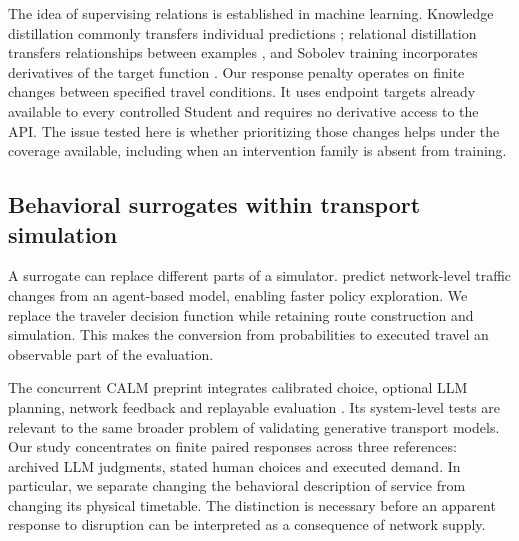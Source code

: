 The idea of supervising relations is established in machine learning. Knowledge distillation commonly transfers individual predictions \citep{hinton2015distilling,gou2021knowledge}; relational distillation transfers relationships between examples \citep{park2019relational}, and Sobolev training incorporates derivatives of the target function \citep{czarnecki2017sobolev}. Our response penalty operates on finite changes between specified travel conditions. It uses endpoint targets already available to every controlled Student and requires no derivative access to the API. The issue tested here is whether prioritizing those changes helps under the coverage available, including when an intervention family is absent from training.

\subsection{Behavioral surrogates within transport simulation}
A surrogate can replace different parts of a simulator. \citet{natterer2025surrogates} predict network-level traffic changes from an agent-based model, enabling faster policy exploration. We replace the traveler decision function while retaining route construction and simulation. This makes the conversion from probabilities to executed travel an observable part of the evaluation.

The concurrent CALM preprint integrates calibrated choice, optional LLM planning, network feedback and replayable evaluation \citep{cheng2026calm}. Its system-level tests are relevant to the same broader problem of validating generative transport models. Our study concentrates on finite paired responses across three references: archived LLM judgments, stated human choices and executed demand. In particular, we separate changing the behavioral description of service from changing its physical timetable. The distinction is necessary before an apparent response to disruption can be interpreted as a consequence of network supply.
